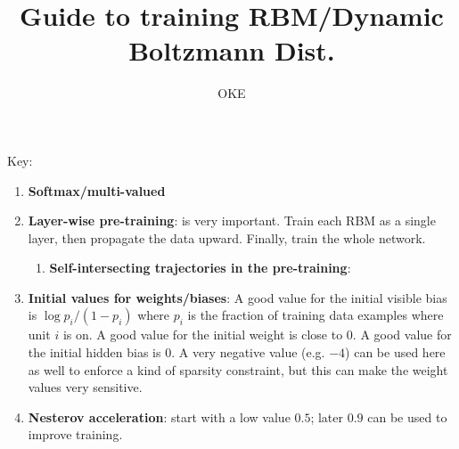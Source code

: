 \documentclass[11pt]{article}
\title{Guide to training RBM/Dynamic Boltzmann Dist.}
\author{OKE}
\begin{document}
\maketitle

Key:
\begin{enumerate}
\item \textbf{Softmax/multi-valued}
\item \textbf{Layer-wise pre-training}: is very important. Train each RBM as a single layer, then propagate the data upward. Finally, train the whole network.
\begin{enumerate}
\item \textbf{Self-intersecting trajectories in the pre-training}:
\end{enumerate}
\item \textbf{Initial values for weights/biases}: A good value for the initial visible bias is $\log p_i/(1-p_i)$ where $p_i$ is the fraction of training data examples where unit $i$ is on. A good value for the initial weight is close to $0$. A good value for the initial hidden bias is $0$. A very negative value (e.g. $-4$) can be used here as well to enforce a kind of sparsity constraint, but this can make the weight values very sensitive.
\item \textbf{Nesterov acceleration}: start with a low value $0.5$; later $0.9$ can be used to improve training.
\end{enumerate}
\end{document}
